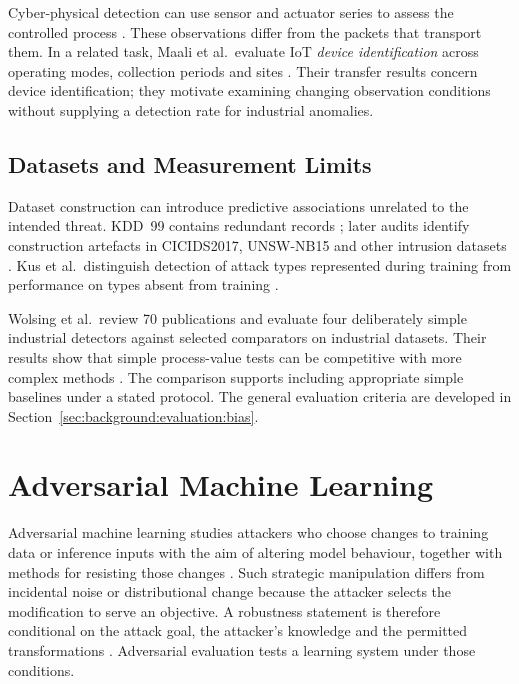 Cyber-physical detection can use sensor and actuator series to assess the controlled process
\cite{mathur2016swat,kravchik2018detecting,goh2016swatdataset}. These observations differ
from the packets that transport them. In a related task, Maali et al.\ evaluate IoT
\emph{device identification} across operating modes, collection periods and sites
\cite{maali2025evaluating}. Their transfer results concern device identification;
they motivate examining changing observation conditions without supplying a detection rate
for industrial anomalies.

\subsection{Datasets and Measurement Limits}
\label{sec:background:networks:datasets}

Dataset construction can introduce predictive associations unrelated to the intended threat.
KDD~99 contains redundant records \cite{tavallaee2009nslkdd}; later audits identify
construction artefacts in CICIDS2017, UNSW-NB15 and other intrusion datasets
\cite{flood2024bad}. Kus et al.\ distinguish detection of attack types represented during
training from performance on types absent from training \cite{kus2022false}.

Wolsing et al.\ review 70 publications and evaluate four deliberately simple industrial
detectors against selected comparators on industrial datasets. Their results show that
simple process-value tests can be competitive with more complex methods
\cite{wolsing2022simple}. The comparison supports including appropriate simple baselines
under a stated protocol. The general evaluation criteria are developed in
Section~\ref{sec:background:evaluation:bias}.

\section{Adversarial Machine Learning}
\label{sec:background:adversarial}

Adversarial machine learning studies attackers who choose changes to training data or inference
inputs with the aim of altering model behaviour, together with methods for resisting those
changes \cite{biggio2018wildpatterns}. Such strategic manipulation differs from incidental noise
or distributional change because the attacker selects the modification to serve an objective. A
robustness statement is therefore conditional on the attack goal, the attacker's knowledge and
the permitted transformations
\cite{carlini2019evaluating}. Adversarial evaluation tests a learning system under those
conditions.

